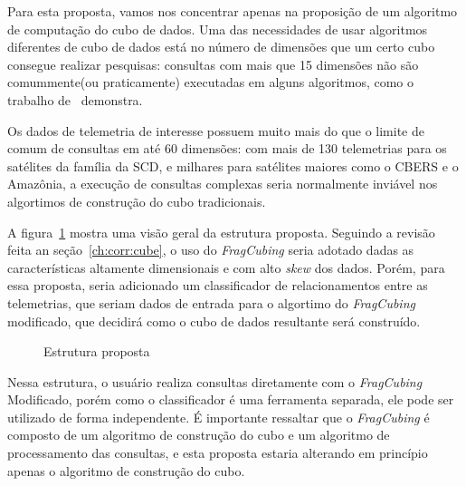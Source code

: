 {\color{cerulean}
Para esta proposta, vamos nos concentrar apenas na proposição de um algoritmo de computação do cubo de dados.
Uma das necessidades de usar algoritmos diferentes de cubo de dados está no número de dimensões que um certo cubo consegue realizar pesquisas: consultas com mais que 15 dimensões não são comummente(ou praticamente) executadas em alguns algoritmos, como o trabalho de~ demonstra.

Os dados de telemetria de interesse possuem muito mais do que o limite de comum de consultas em até 60 dimensões: com mais de 130 telemetrias para os satélites da família da SCD, e milhares para satélites maiores como o CBERS e o Amazônia, a execução de consultas complexas seria normalmente inviável nos algortimos de construção do cubo tradicionais.

A figura~\ref{fig:qualistructure} mostra uma visão geral da estrutura proposta.
Seguindo a revisão feita an seção~\ref{ch:corr:cube}, o uso do \textit{FragCubing} seria adotado dadas as características altamente dimensionais e com alto \textit{skew} dos dados.
Porém, para essa proposta, seria adicionado um classificador de relacionamentos entre as telemetrias, que seriam dados de entrada para o algortimo do \textit{FragCubing} modificado, que decidirá como o cubo de dados resultante será construído.

\begin{figure}[!htb]
	\caption{Estrutura proposta}\label{fig:qualistructure}
	\vspace{2mm}
	\begin{center}
	\end{center}
	\vspace{1mm}
	\legenda{}
\end{figure}

Nessa estrutura, o usuário realiza consultas diretamente com o \textit{FragCubing} Modificado, porém como o classificador é uma ferramenta separada, ele pode ser utilizado de forma independente.
É importante ressaltar que o \textit{FragCubing} é composto de um algoritmo de construção do cubo e um algoritmo de processamento das consultas, e esta proposta estaria alterando em princípio apenas o algoritmo de construção do cubo.

}
